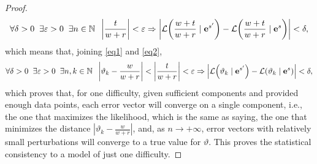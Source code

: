 \documentclass{article}
\newcommand{\0}{\mathbbold{0}}
\newcommand{\1}{\mathds{1}}
\newcommand{\2}{\mathbbold{2}}
\newcommand{\Lh}[2]{\mathcal{L}\!\left(#1 \mid #2\right)}
\begin{document}
\begin{proof}
    \begin{equation}
        \forall \delta > 0 \;\; \exists \varepsilon > 0 \;\; \exists n \in \mathbb{N} \;\; \left| \frac{t}{w+r} \right| < \varepsilon \Rightarrow \left| \Lh{\frac{w+t}{w+r}}{{\bf e}^{s'}} - \Lh{\frac{w+t}{w+r}}{{\bf e}^{s}} \right| < \delta, \label{eq2}
    \end{equation}
    which means that, joining \eqref{eq1} and \eqref{eq2},
    \begin{equation}
        \forall \delta > 0 \;\; \exists \varepsilon > 0 \;\; \exists n,k \in \mathbb{N} \;\; \left| \vartheta_k - \frac{w}{w+r} \right| < \left| \frac{t}{w+r} \right| < \varepsilon \Rightarrow \left| \Lh{\vartheta_k}{{\bf e}^{s'}} - \Lh{\vartheta_k}{{\bf e}^{s}} \right| < \delta, \label{eq3}
    \end{equation}
    which proves that, for one difficulty, given sufficient components and provided enough data points, each error vector will converge on a single component, i.e., the one that maximizes the likelihood, which is the same as saying, the one that minimizes the distance $ \left| \vartheta_k - \frac{w}{w+r} \right| $, and, as $n \rightarrow +\infty$, error vectors with relatively small perturbations will converge to a true value for $\vartheta$.
    This proves the statistical consistency to a model of just one difficulty.
    

\end{proof}
\end{document}
